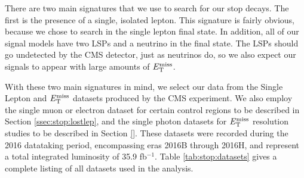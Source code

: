 There are two main signatures that we use to search for our stop
decays. The first is the presence of a single, isolated lepton. This
signature is fairly obvious, because we chose to search in the single
lepton final state. In addition, all of our signal models have two
LSPs and a neutrino in the final state. The LSPs should go undetected
by the CMS detector, just as neutrinos do, so we also expect our
signals to appear with large amounts of $E_\text{T}^\text{miss}$. %

With these two main signatures in mind, we select our data from the
Single Lepton and $E_\text{T}^\text{miss}$ datasets produced by the CMS
experiment. We also employ the single muon or electron dataset for certain control
regions to be described in Section \ref{ssec:stop:lostlep}, and the
single photon datasets for $E_\text{T}^\text{miss}$ resolution studies to be %
described in Section \ref{}. These datasets were recorded during the
2016 datataking period, encompassing eras 2016B through 2016H, and
represent a total integrated luminosity of 35.9 fb$^{-1}$. Table
\ref{tab:stop:datasets} gives a complete listing of all datasets used
in the analysis.


